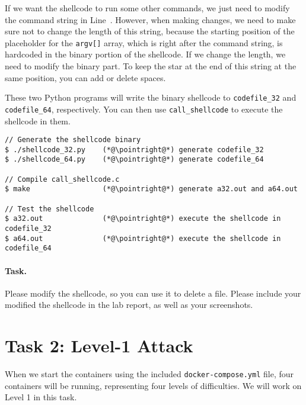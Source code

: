 If we want the shellcode to run some other commands,
we just need to modify the command string in Line~.
However, when making changes, we need to 
make sure not to change the length of this string, because the 
starting position of the placeholder for the \texttt{argv[]} array,
which is right after the command string,
is hardcoded in the binary portion of the shellcode. If 
we change the length, we need to modify the binary part. 
To keep the star at the end of this string at the same position, 
you can add or delete spaces.


These two Python programs will
write the binary shellcode to \texttt{codefile\_32}
and \texttt{codefile\_64}, respectively. You can then use 
\texttt{call\_shellcode} to execute the shellcode in them. 

\newcommand{\pointright}{\ding{221}}

\begin{lstlisting}
// Generate the shellcode binary 
$ ./shellcode_32.py    (*@\pointright@*) generate codefile_32
$ ./shellcode_64.py    (*@\pointright@*) generate codefile_64

// Compile call_shellcode.c
$ make                 (*@\pointright@*) generate a32.out and a64.out 

// Test the shellcode 
$ a32.out              (*@\pointright@*) execute the shellcode in codefile_32
$ a64.out              (*@\pointright@*) execute the shellcode in codefile_64
\end{lstlisting}
 

\paragraph{Task.} Please modify the shellcode, so you can
use it to delete a file.  Please include your modified the shellcode
in the lab report, as well as your screenshots.



\section{Task 2: Level-1 Attack} 


When we start the containers using the included 
\texttt{docker-compose.yml} file, four containers will be 
running, representing four levels of difficulties. 
We will work on Level 1 in this task. 



